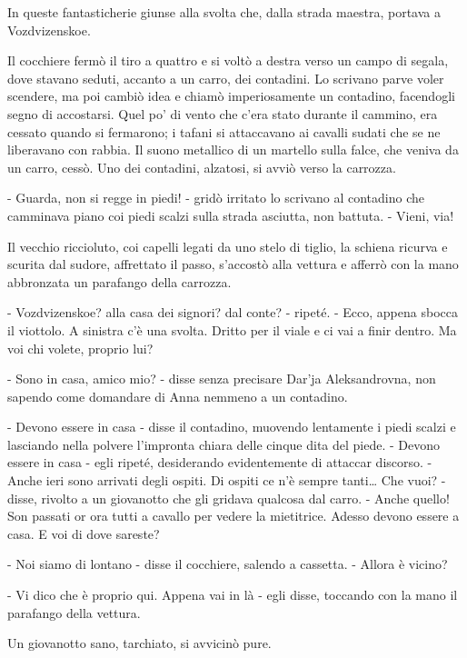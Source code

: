 In queste fantasticherie giunse alla svolta che, dalla strada maestra, portava a Vozdvizenskoe. 

\label{xvii-5} 

Il cocchiere fermò il tiro a quattro e si voltò a destra verso un campo di segala, dove stavano seduti, accanto a un carro, dei contadini. Lo scrivano parve voler scendere, ma poi cambiò idea e chiamò imperiosamente un contadino, facendogli segno di accostarsi. Quel po' di vento che c'era stato durante il cammino, era cessato quando si fermarono; i tafani si attaccavano ai cavalli sudati che se ne liberavano con rabbia. Il suono metallico di un martello sulla falce, che veniva da un carro, cessò. Uno dei contadini, alzatosi, si avviò verso la carrozza. 

- Guarda, non si regge in piedi! - gridò irritato lo scrivano al contadino che camminava piano coi piedi scalzi sulla strada asciutta, non battuta. - Vieni, via! 

Il vecchio riccioluto, coi capelli legati da uno stelo di tiglio, la schiena ricurva e scurita dal sudore, affrettato il passo, s'accostò alla vettura e afferrò con la mano abbronzata un parafango della carrozza. 

- Vozdvizenskoe? alla casa dei signori? dal conte? - ripeté. - Ecco, appena sbocca il viottolo. A sinistra c'è una svolta. Dritto per il viale e ci vai a finir dentro. Ma voi chi volete, proprio lui? 

- Sono in casa, amico mio? - disse senza precisare Dar'ja Aleksandrovna, non sapendo come domandare di Anna nemmeno a un contadino. 

- Devono essere in casa - disse il contadino, muovendo lentamente i piedi scalzi e lasciando nella polvere l'impronta chiara delle cinque dita del piede. - Devono essere in casa - egli ripeté, desiderando evidentemente di attaccar discorso. - Anche ieri sono arrivati degli ospiti. Di ospiti ce n'è sempre tanti\ldots{} Che vuoi? - disse, rivolto a un giovanotto che gli gridava qualcosa dal carro. - Anche quello! Son passati or ora tutti a cavallo per vedere la mietitrice. Adesso devono essere a casa. E voi di dove sareste? 

- Noi siamo di lontano - disse il cocchiere, salendo a cassetta. - Allora è vicino? 

- Vi dico che è proprio qui. Appena vai in là - egli disse, toccando con la mano il parafango della vettura. 

Un giovanotto sano, tarchiato, si avvicinò pure. 

